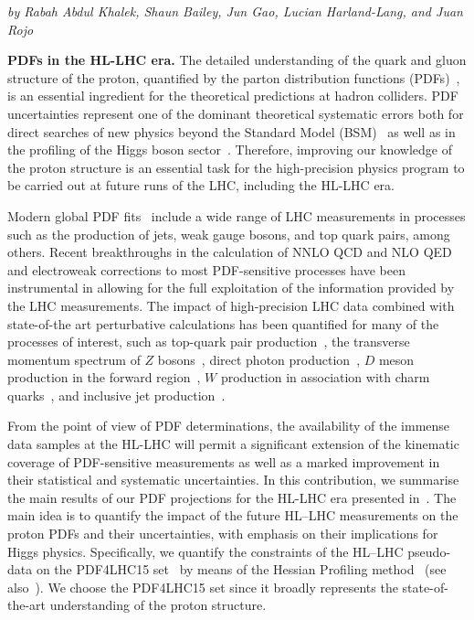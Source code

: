 \begin{center}
  \textit{by Rabah Abdul Khalek, Shaun Bailey,
    Jun Gao, Lucian Harland-Lang,  and Juan Rojo}
\end{center}

{\bf PDFs in the HL-LHC era.}
%
The detailed understanding of the quark and gluon
structure of the proton, quantified by the parton distribution functions
(PDFs)~\cite{Gao:2017yyd,Rojo:2015acz,Forte:2013wc},
is an essential ingredient for the theoretical predictions at hadron colliders.
%
PDF uncertainties represent one of the dominant theoretical systematic
errors
both for direct searches of new physics beyond the Standard
Model (BSM)~\cite{Beenakker:2015rna}
as well as in
the profiling of the Higgs boson sector~\cite{deFlorian:2016spz}.
%
Therefore, improving our knowledge of the proton structure
is an essential task for the high-precision physics
program to be carried out at future runs of the LHC, including
the HL-LHC era.

Modern global PDF fits~\cite{Ball:2017nwa,Dulat:2015mca,
  Harland-Lang:2014zoa,Alekhin:2017kpj}
include a wide range of LHC measurements in
processes such as the production of jets, weak gauge bosons,
and top quark pairs, among others.
%
Recent breakthroughs in the calculation
of NNLO QCD and NLO QED and electroweak corrections to
most PDF-sensitive processes have been instrumental in
allowing for the full exploitation of the information provided by the LHC measurements.
%
The impact of high-precision LHC data combined with state-of-the art
perturbative calculations has been quantified for many of the processes
of interest, such as top-quark pair production~\cite{Czakon:2016olj,Guzzi:2014wia},
the transverse momentum spectrum of $Z$ bosons~\cite{Boughezal:2017nla}, 
direct photon production~\cite{dEnterria:2012kvo,Campbell:2018wfu},
$D$ meson production in the forward region~\cite{Gauld:2015yia,Zenaiev:2015rfa,Gauld:2016kpd}, $W$ production
in association with charm quarks~\cite{Aad:2014xca,Chatrchyan:2013mza},
and inclusive jet production~\cite{Currie:2016bfm,Rojo:2014kta}.

From the point of view of PDF determinations, the availability of the
immense data samples at the HL-LHC
will permit a significant extension
of the kinematic coverage of PDF-sensitive measurements
as well as a marked improvement in their statistical and systematic uncertainties.
%
In this contribution, we summarise the main results
of our PDF projections for the HL-LHC era presented
in~\cite{Khalek:2018mdn}.
%
The main idea is to quantify the impact of the future HL--LHC
measurements on the proton PDFs and their
uncertainties, with emphasis on
their implications for Higgs physics.
%
Specifically, we quantify the 
constraints of the HL--LHC pseudo-data
on the PDF4LHC15
set~\cite{Butterworth:2015oua,Gao:2013bia,Carrazza:2015hva,Carrazza:2015aoa}
by means
of the Hessian Profiling
method~\cite{Paukkunen:2014zia} (see also~\cite{Schmidt:2018hvu}).
%
We choose the PDF4LHC15 set since it broadly represents
the state-of-the-art understanding of
the proton structure.

